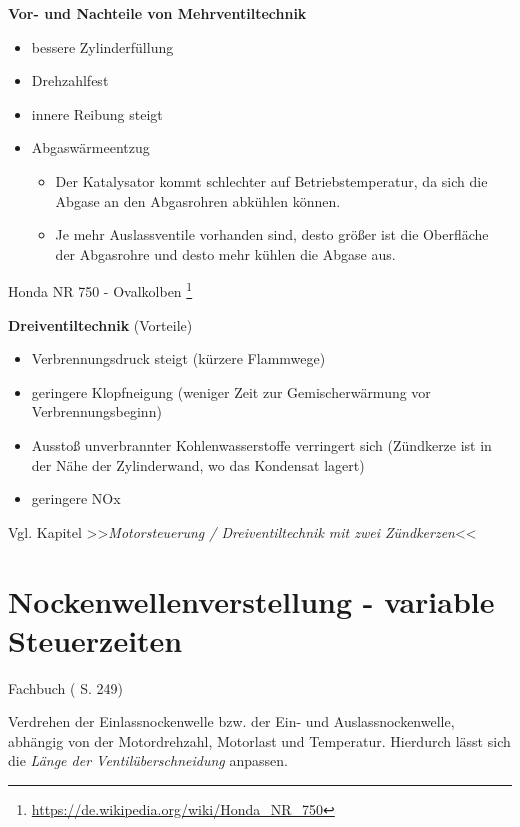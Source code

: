 \textbf{Vor- und Nachteile von Mehrventiltechnik}

\begin{itemize}
\item
  bessere Zylinderfüllung
\item
  Drehzahlfest
\item
  innere Reibung steigt
\item
  Abgaswärmeentzug

  \begin{itemize}
  \item
    Der Katalysator kommt schlechter auf Betriebstemperatur, da sich die
    Abgase an den Abgasrohren abkühlen können.
  \item
    Je mehr Auslassventile vorhanden sind, desto größer ist die
    Oberfläche der Abgasrohre und desto mehr kühlen die Abgase aus.
  \end{itemize}
\end{itemize}

Honda NR 750 - Ovalkolben \footnote{\url{https://de.wikipedia.org/wiki/Honda_NR_750}}

\textbf{Dreiventiltechnik} (Vorteile)

\begin{itemize}
\item
  Verbrennungsdruck steigt (kürzere Flammwege)
\item
  geringere Klopfneigung (weniger Zeit zur Gemischerwärmung vor
  Verbrennungsbeginn)
\item
  Ausstoß unverbrannter Kohlenwasserstoffe verringert sich (Zündkerze
  ist in der Nähe der Zylinderwand, wo das Kondensat lagert)
\item
  geringere NOx
\end{itemize}

Vgl. Kapitel >>\emph{Motorsteuerung / Dreiventiltechnik mit zwei
Zündkerzen}<<

\section{Nockenwellenverstellung - variable
Steuerzeiten}\label{nockenwellenverstellung-variable-steuerzeiten}

Fachbuch (\textcite{brand:2020:fachkundeKfz} S. 249)

Verdrehen der Einlassnockenwelle bzw. der Ein- und Auslassnockenwelle,
abhängig von der Motordrehzahl, Motorlast und Temperatur. Hierdurch
lässt sich die \emph{Länge der Ventilüberschneidung} anpassen.

